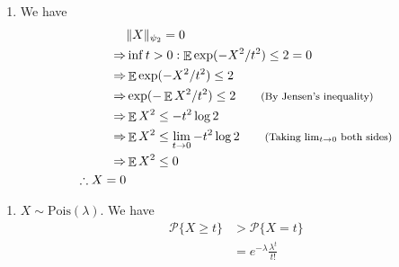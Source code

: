 \documentclass[11pt]{article}
\newenvironment{exercise}[2][Exercise]{\begin{trivlist}
\item[\hskip \labelsep {\bfseries #1}\hskip \labelsep {\bfseries #2.}]}{\end{trivlist}}
\newenvironment{solution}[1][Solution]{\begin{trivlist}
\item[\hskip \labelsep {\bfseries #1}\hskip \labelsep]}{\end{trivlist}}
\DeclareMathOperator*{\E}{\mathbb{E}}
\newcommand*{\annot}[1]{\tag*{\footnotesize{(#1)}}}
\begin{document}
\begin{solution}
\begin{enumerate}
\item We have 
\begin{align*}
& \lVert X \rVert_{\psi_2} = 0 \\
\Rightarrow & \inf{t>0: \E\exp(-X^2/t^2)\leq 2} = 0 \\
\Rightarrow & \E\exp(-X^2/t^2)\leq 2 \\
\Rightarrow & \exp(-\E X^2/t^2)\leq 2 \annot{By Jensen's inequality} \\
\Rightarrow & \E X^2 \leq -t^2 \log 2 \\
\Rightarrow & \E X^2 \leq \lim_{t\rightarrow0}-t^2 \log 2 \annot{Taking $\lim_{t\rightarrow 0}$ both sides}\\
\Rightarrow & \E X^2 \leq 0 \\
\therefore X = 0
\end{align*}
\end{enumerate}
\end{solution}

\begin{exercise}{2.5.9}
\end{exercise}

\begin{solution}
\begin{enumerate}[label=(\roman*)]
\item $X \sim \text{Pois}(\lambda)$. We have
\begin{align*}
\mathcal{P}\{ X \geq t\} &> \mathcal{P}\{ X = t\} \\
	&= e^{-\lambda}\frac{\lambda^t}{t!} \\ 
\end{align*}
\end{enumerate}
\end{solution}

\begin{exercise}{2.5.10}
\end{exercise}

\begin{solution}

\end{solution}

\begin{exercise}{2.5.11}
\end{exercise}

\begin{solution}

\end{solution}
\end{document}

